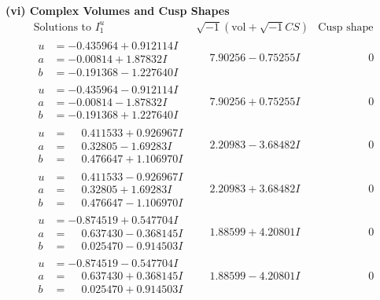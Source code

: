 \documentclass[1p]{elsarticle_modified}
\theoremstyle{definition}
\newcommand{\I}{\sqrt{-1}}
\begin{document}
\newpage\flushleft \textbf{(vi) Complex Volumes and Cusp Shapes}
$$\begin{array}{c|c|c}  
\text{Solutions to }I^u_{1}& \I (\text{vol} + \sqrt{-1}CS) & \text{Cusp shape}\\
 \hline 
\begin{aligned}
u &= -0.435964 + 0.912114 I \\
a &= -0.00814 + 1.87832 I \\
b &= -0.191368 - 1.227640 I\end{aligned}
 & \phantom{-}7.90256 - 0.75255 I & \phantom{-0.000000 } 0 \\ \hline\begin{aligned}
u &= -0.435964 - 0.912114 I \\
a &= -0.00814 - 1.87832 I \\
b &= -0.191368 + 1.227640 I\end{aligned}
 & \phantom{-}7.90256 + 0.75255 I & \phantom{-0.000000 } 0 \\ \hline\begin{aligned}
u &= \phantom{-}0.411533 + 0.926967 I \\
a &= \phantom{-}0.32805 - 1.69283 I \\
b &= \phantom{-}0.476647 + 1.106970 I\end{aligned}
 & \phantom{-}2.20983 - 3.68482 I & \phantom{-0.000000 } 0 \\ \hline\begin{aligned}
u &= \phantom{-}0.411533 - 0.926967 I \\
a &= \phantom{-}0.32805 + 1.69283 I \\
b &= \phantom{-}0.476647 - 1.106970 I\end{aligned}
 & \phantom{-}2.20983 + 3.68482 I & \phantom{-0.000000 } 0 \\ \hline\begin{aligned}
u &= -0.874519 + 0.547704 I \\
a &= \phantom{-}0.637430 - 0.368145 I \\
b &= \phantom{-}0.025470 - 0.914503 I\end{aligned}
 & \phantom{-}1.88599 + 4.20801 I & \phantom{-0.000000 } 0 \\ \hline\begin{aligned}
u &= -0.874519 - 0.547704 I \\
a &= \phantom{-}0.637430 + 0.368145 I \\
b &= \phantom{-}0.025470 + 0.914503 I\end{aligned}
 & \phantom{-}1.88599 - 4.20801 I & \phantom{-0.000000 } 0 \\ \hline\begin{aligned}

\end{aligned}
\end{array}$$
\end{document}

